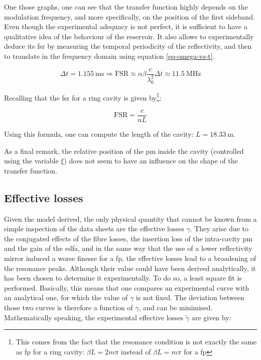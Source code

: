 One those graphs, one can see that the transfer function highly depends on the modulation frequency, and more specifically, on the position of the first sideband. Even though the experimental adequacy is not perfect, it is sufficient to have a qualitative idea of the behaviour of the reservoir. It also allows to experimentally deduce its \gls{fsr} by measuring the temporal periodicity of the reflectivity, and then to translate in the frequency domain using equation \eqref{eq-omega-vs-t}.

\begin{equation}
	\Delta t = \SI{1.155}{\milli\second} \Longrightarrow \text{FSR} \approx  \alpha \beta \frac{c}{\lambda_0^2} \Delta t  \approx \SI{11.5}{\mega\hertz}
\end{equation}

Recalling that the \gls{fsr} for a ring cavity is given by\footnote{This comes from the fact that the resonance condition is not exactly the same as \gls{fp} for a ring cavity: $\beta L = 2m\pi$ instead of $\beta L = m \pi$ for a \gls{fp}}:

\begin{equation}
	\mathrm{FSR} = \frac{c}{nL}
\end{equation}

Using this formula, one can compute the length of the cavity: $L=\SI{18.33}{\metre}$.

As a final remark, the relative position of the \gls{pm} inside the cavity (controlled using the variable $\xi$) does not seem to have an influence on the shape of the transfer function.


\subsection{Effective losses}

Given the model derived, the only physical quantity that cannot be known from a simple inspection of the data sheets are the effective losses $\gamma$. They arise due to the conjugated effects of the fibre losses, the insertion loss of the intra-cavity \gls{pm} and the gain of the \gls{edfa}, and in the same way that the use of a lower reflectivity mirror induced a worse finesse for a \gls{fp}, the effective losses lead to a broadening of the resonance peaks. Although their value could have been derived analytically, it has been chosen to determine it experimentally. To do so, a least square fit is performed. Basically, this means that one compares an experimental curve with an analytical one, for which the value of $\gamma$ is not fixed. The deviation between those two curves is therefore a function of $\gamma$, and can be minimised. Mathematically speaking, the experimental effective losses $\tilde{\gamma}$ are given by:

